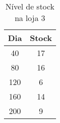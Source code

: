 \begin{table}[htpb]
\begin{center}
\begin{tabular}{cc}
\toprule
Dia & Stock	 	\\ \midrule
40 & 17                 \\ 
80 & 16                 \\ 
120 & 6                 \\ 
160 & 14                \\ 
200 & 9     		\\ 
\bottomrule
\end{tabular}
\end{center}
\caption{Nível de stock na loja 3}
\label{tab:tabela4}
\end{table}

